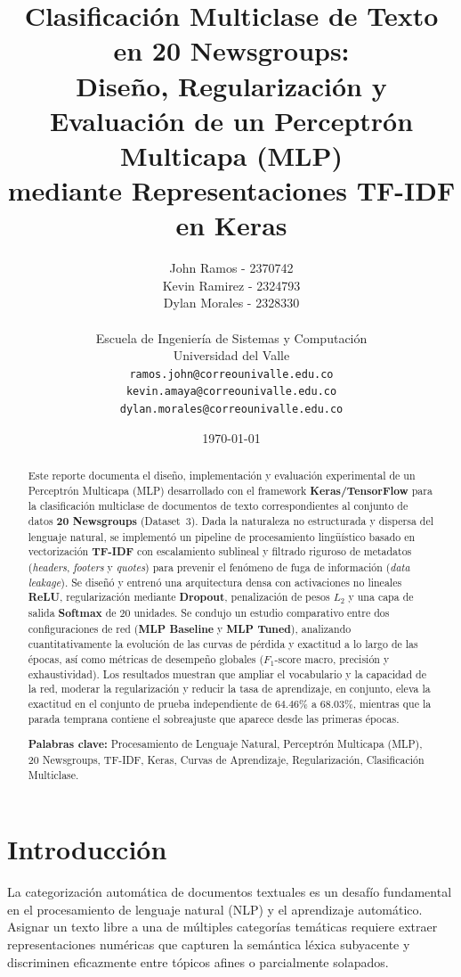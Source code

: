 \documentclass[12pt, a4paper]{article}
\title{
    \textbf{Clasificación Multiclase de Texto en 20 Newsgroups:} \\
    \large Diseño, Regularización y Evaluación de un Perceptrón Multicapa (MLP) \\
    mediante Representaciones TF-IDF en Keras \\[1em]
 
}
\author{
    John Ramos - 2370742\\
    Kevin Ramirez - 2324793 \\
    Dylan Morales - 2328330 \\\\
    \small Escuela de Ingeniería de Sistemas y Computación \\ Universidad del Valle\\
    \small \texttt{ramos.john@correounivalle.edu.co} \\
    \small \texttt{kevin.amaya@correounivalle.edu.co} \\
    \small \texttt{dylan.morales@correounivalle.edu.co}
}
\date{\today}
\begin{document}
\maketitle
\thispagestyle{fancy}

\begin{abstract}
Este reporte documenta el diseño, implementación y evaluación experimental de un Perceptrón Multicapa (MLP) desarrollado con el framework \textbf{Keras/TensorFlow} para la clasificación multiclase de documentos de texto correspondientes al conjunto de datos \textbf{20 Newsgroups} (Dataset~3). Dada la naturaleza no estructurada y dispersa del lenguaje natural, se implementó un pipeline de procesamiento lingüístico basado en vectorización \textbf{TF-IDF} con escalamiento sublineal y filtrado riguroso de metadatos (\textit{headers}, \textit{footers} y \textit{quotes}) para prevenir el fenómeno de fuga de información (\textit{data leakage}). Se diseñó y entrenó una arquitectura densa con activaciones no lineales \textbf{ReLU}, regularización mediante \textbf{Dropout}, penalización de pesos $L_2$ y una capa de salida \textbf{Softmax} de $20$ unidades. Se condujo un estudio comparativo entre dos configuraciones de red (\textbf{MLP Baseline} y \textbf{MLP Tuned}), analizando cuantitativamente la evolución de las curvas de pérdida y exactitud a lo largo de las épocas, así como métricas de desempeño globales ($F_1$-score macro, precisión y exhaustividad). Los resultados muestran que ampliar el vocabulario y la capacidad de la red, moderar la regularización y reducir la tasa de aprendizaje, en conjunto, eleva la exactitud en el conjunto de prueba independiente de $64.46\%$ a $68.03\%$, mientras que la parada temprana contiene el sobreajuste que aparece desde las primeras épocas.

\textbf{Palabras clave:} Procesamiento de Lenguaje Natural, Perceptrón Multicapa (MLP), 20 Newsgroups, TF-IDF, Keras, Curvas de Aprendizaje, Regularización, Clasificación Multiclase.
\end{abstract}

\tableofcontents
\newpage

\section{Introducción}

La categorización automática de documentos textuales es un desafío fundamental en el procesamiento de lenguaje natural (NLP) y el aprendizaje automático. Asignar un texto libre a una de múltiples categorías temáticas requiere extraer representaciones numéricas que capturen la semántica léxica subyacente y discriminen eficazmente entre tópicos afines o parcialmente solapados.
\end{document}
